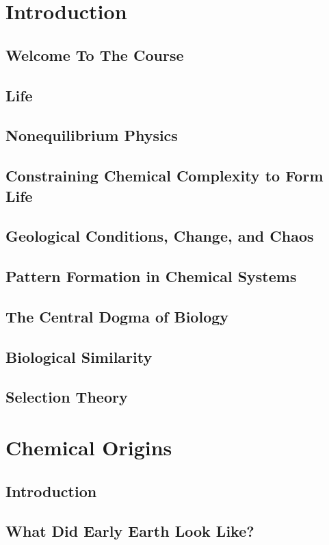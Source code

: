 \documentclass[]{article}
\begin{document}
\section{Introduction}
\subsection{Welcome To The Course}
\subsection{Life}
\cite{bell2015potentially}
\subsection{Nonequilibrium Physics}
\subsection{Constraining Chemical Complexity to Form Life}
\subsection{Geological Conditions, Change, and Chaos}
\subsection{Pattern Formation in Chemical Systems}
\subsection{The Central Dogma of Biology}
\cite{crick1958biological} \cite{crick1970central}
\subsection{Biological Similarity}
\subsection{Selection Theory}

\section{Chemical Origins}
\subsection{Introduction}
\subsection{What Did Early Earth Look Like?}
\end{document}

